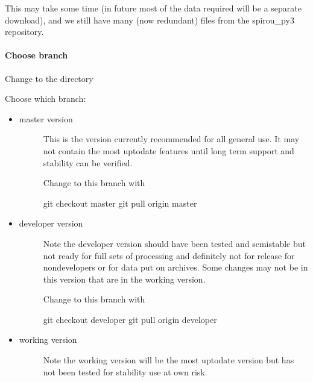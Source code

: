 \documentclass[a4paper,10pt,english]{report}
\begin{document}
This may take some time (in future most of the data required will be a separate download),
and we still have many (now redundant) files from the spirou\_py3 repository.


\paragraph{Choose branch}
\label{\detokenize{user/general/installation:choose-branch}}\label{\detokenize{user/general/installation:installation-choose-branch}}
Change to the  directory

Choose which branch:
\begin{itemize}
\item {} \begin{description}
\item[{master version}] \leavevmode
This is the version currently recommended for all general use.
It may not contain the most up\sphinxhyphen{}to\sphinxhyphen{}date features until long term support
and stability can be verified.

Change to this branch with

\begin{sphinxVerbatim}[commandchars=\\\{\}]
git checkout master
git pull origin master
\end{sphinxVerbatim}

\end{description}

\item {} \begin{description}
\item[{developer version}] \leavevmode
Note the developer version should have been tested and semi\sphinxhyphen{}stable but
not ready for full sets of processing and definitely not for release for
non\sphinxhyphen{}developers or for data put on archives. Some changes may not be
in this version that are in the working version.

Change to this branch with

\begin{sphinxVerbatim}[commandchars=\\\{\}]
git checkout developer
git pull origin developer
\end{sphinxVerbatim}

\end{description}

\item {} \begin{description}
\item[{working version}] \leavevmode
Note the working version will be the most up\sphinxhyphen{}to\sphinxhyphen{}date version but has not been
tested for stability \sphinxhyphen{} use at own risk.


\end{description}
\end{itemize}
\end{document}
